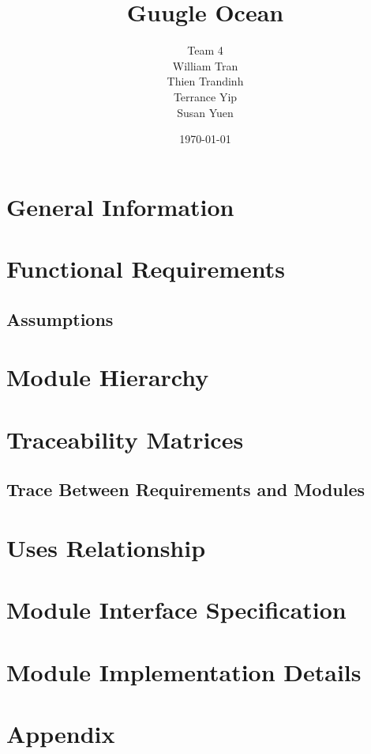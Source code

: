 \documentclass{article}
\title{Guugle Ocean}
\author{ Team 4 \\ 
        William Tran \\
		Thien Trandinh \\
		Terrance Yip \\
		Susan Yuen}
\date{\today}
\begin{document}
\maketitle
\newpage
\tableofcontents
\listoffigures
\listoftables

\newpage

\section {General Information}

\section {Functional Requirements}
\subsection{Assumptions}

\section {Module Hierarchy}

\section {Traceability Matrices}
\subsection{Trace Between Requirements and Modules}

\section {Uses Relationship}

\section {Module Interface Specification}

\section {Module Implementation Details}

\section {Appendix}
\end{document}
